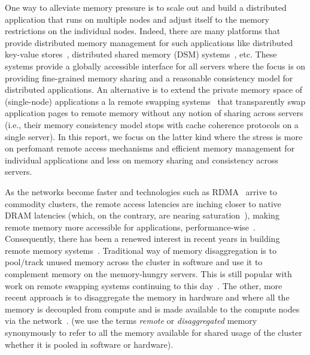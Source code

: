 One way to alleviate memory pressure is to scale out and 
build a distributed application that runs on multiple nodes and 
adjust itself to the memory restrictions on the individual 
nodes. Indeed, there are many platforms that provide distributed 
memory management for such applications like distributed key-value 
stores~\cite{Ousterhout2010,Lim2012,Novakovic2016,Kalia2015},
distributed shared memory (DSM) 
systems~\cite{treadmarks,dsm1,farm,gam}, etc. These systems 
provide a globally accessible interface for all servers where  
the focus is on providing fine-grained memory sharing and 
a reasonable consistency model for distributed applications. 
An alternative is to extend the private memory space 
of (single-node) applications a la 
remote swapping systems~\cite{gms,cashmere} that transparently
swap application pages to remote memory without any notion 
of sharing across servers (i.e., their memory 
consistency model stops with cache coherence protocols on a 
single server). In this report, we focus 
on the latter kind where the stress is more on perfomant 
remote access mechanisms and efficient memory management for 
individual applications and less on memory sharing and 
consistency across servers.

As the networks become faster and technologies such as 
RDMA~\cite{farm,rocev2} arrive to commodity clusters, 
the remote access latencies are inching closer to native 
DRAM latencies (which, on the contrary, are nearing 
saturation~\cite{Aguilera2017}), making remote memory more 
accessible for applications, performance-wise~\cite{netdisagg}. 
Consequently, there has been a renewed interest in 
recent years in building remote memory 
systems~\cite{infiniswap,zswap,leap,fastswap,
legoos,kona,aifm,semeru,remregions,literdma}.
Traditional way of memory disaggregation is to pool/track  
unused memory across the cluster in software 
and use it to complement memory on the memory-hungry servers.
This is still popular with work on remote swapping systems 
continuing to this day~\cite{infiniswap,fastswap,zswap,leap}.
The other, more recent approach is to disaggregate the memory 
in hardware and where all the memory is decoupled from compute
and is made available to the compute nodes via 
the network~\cite{legoos,bladedisagg1,sonuma}. 
(we use the terms \textit{remote} or 
\textit{disaggregated} memory synonymously to refer 
to all the memory 
available for shared usage of the cluster whether it is 
pooled in software or hardware). 

